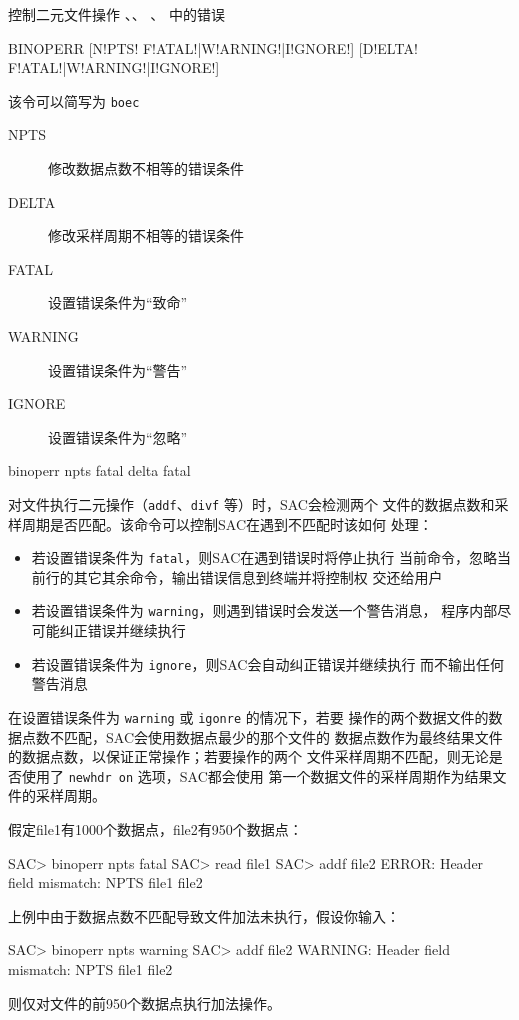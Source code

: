 \label{cmd:binoperr}

控制二元文件操作 、、
、 中的错误

\begin{SACSTX}
BINOPERR [N!PTS! F!ATAL!|W!ARNING!|I!GNORE!] [D!ELTA! F!ATAL!|W!ARNING!|I!GNORE!]
\end{SACSTX}
该令可以简写为 \texttt{boec}

\begin{description}
\item [NPTS]  修改数据点数不相等的错误条件
\item [DELTA] 修改采样周期不相等的错误条件
\item [FATAL] 设置错误条件为``致命''
\item [WARNING] 设置错误条件为``警告''
\item [IGNORE]  设置错误条件为``忽略''
\end{description}

\begin{SACDFT}
binoperr npts fatal delta fatal
\end{SACDFT}

对文件执行二元操作（\texttt{addf}、\texttt{divf} 等）时，SAC会检测两个
文件的数据点数和采样周期是否匹配。该命令可以控制SAC在遇到不匹配时该如何
处理：
\begin{itemize}
\item 若设置错误条件为 \texttt{fatal}，则SAC在遇到错误时将停止执行
    当前命令，忽略当前行的其它其余命令，输出错误信息到终端并将控制权
    交还给用户
\item 若设置错误条件为 \texttt{warning}，则遇到错误时会发送一个警告消息，
    程序内部尽可能纠正错误并继续执行
\item 若设置错误条件为 \texttt{ignore}，则SAC会自动纠正错误并继续执行
    而不输出任何警告消息
\end{itemize}

在设置错误条件为 \texttt{warning} 或 \texttt{igonre} 的情况下，若要
操作的两个数据文件的数据点数不匹配，SAC会使用数据点最少的那个文件的
数据点数作为最终结果文件的数据点数，以保证正常操作；若要操作的两个
文件采样周期不匹配，则无论是否使用了 \texttt{newhdr on} 选项，SAC都会使用
第一个数据文件的采样周期作为结果文件的采样周期。

假定file1有1000个数据点，file2有950个数据点：
\begin{SACCode}
SAC> binoperr npts fatal
SAC> read file1
SAC> addf file2
ERROR:  Header field mismatch: NPTS file1 file2
\end{SACCode}

上例中由于数据点数不匹配导致文件加法未执行，假设你输入：
\begin{SACCode}
SAC> binoperr npts warning
SAC> addf file2
WARNING:  Header field mismatch: NPTS file1 file2
\end{SACCode}
则仅对文件的前950个数据点执行加法操作。
